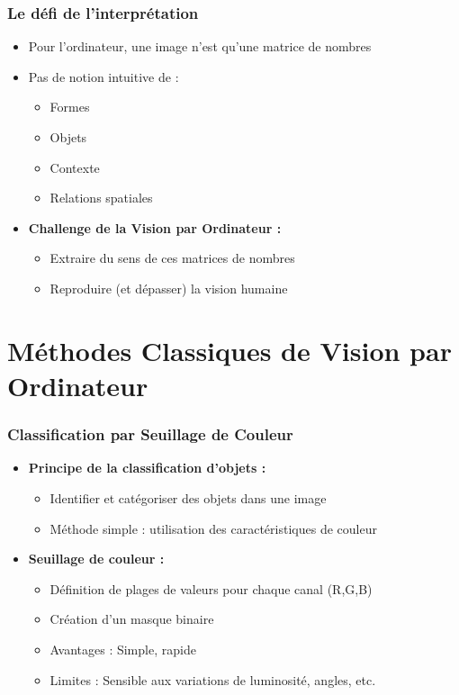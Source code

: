 \documentclass{beamer}
\begin{document}
\begin{frame}
    \frametitle{Le défi de l'interprétation}
    \begin{itemize}
        \item Pour l'ordinateur, une image n'est qu'une matrice de nombres
        \item Pas de notion intuitive de :
        \begin{itemize}
            \item Formes
            \item Objets
            \item Contexte
            \item Relations spatiales
        \end{itemize}
        \item \textbf{Challenge de la Vision par Ordinateur :}
        \begin{itemize}
            \item Extraire du sens de ces matrices de nombres
            \item Reproduire (et dépasser) la vision humaine
        \end{itemize}
    \end{itemize}
\end{frame}

\section{Méthodes Classiques de Vision par Ordinateur}

\begin{frame}
    \frametitle{Classification par Seuillage de Couleur}
    \begin{itemize}
        \item \textbf{Principe de la classification d'objets :}
        \begin{itemize}
            \item Identifier et catégoriser des objets dans une image
            \item Méthode simple : utilisation des caractéristiques de couleur
        \end{itemize}
        \item \textbf{Seuillage de couleur :}
        \begin{itemize}
            \item Définition de plages de valeurs pour chaque canal (R,G,B)
            \item Création d'un masque binaire
            \item Avantages : Simple, rapide
            \item Limites : Sensible aux variations de luminosité, angles, etc.
        \end{itemize}
    \end{itemize}
\end{frame}
\end{document}
